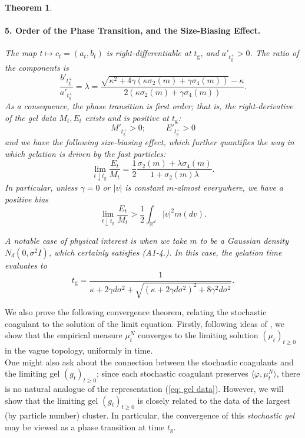 \documentclass[11pt, notitlepage]{article}
\newtheorem{thm}{Theorem}[section]
\begin{document}
\begin{thm}
\paragraph{\textbf{5. Order of the Phase Transition, and the Size-Biasing Effect.}} The map $t\mapsto c_t=(a_t,b_t)$ is right-differentiable at $t_\mathrm{g}$, and $a'_{t_\mathrm{g}^+}>0$. The ratio of the components is \begin{equation} \frac{b'_{t_\mathrm{g}^+}}{a'_{t_\mathrm{g}^+}}=\lambda =\frac{\sqrt{\kappa^2+4\gamma(\kappa\sigma_2(m)+\gamma \sigma_4(m))}-\kappa}{2(\kappa\sigma_2(m)+\gamma\sigma_4(m))}.\end{equation} As a consequence, the phase transition is first order; that is, the right-derivative of the gel data $M_t, E_t$ exists and is positive at $t_\mathrm{g}$: \begin{equation}M'_{t_\mathrm{g}^+}>0; \hspace{1cm} E'_{t_\mathrm{g}^+}>0 \end{equation} and we have the following \emph{size-biasing} effect, which further quantifies the way in which gelation is driven by the fast particles:  \begin{equation}
    \lim_{t\downarrow t_\mathrm{g}}\frac{E_t}{M_t}=\frac{1}{2}\frac{\sigma_2(m)+\lambda\sigma_4(m)}{1+\sigma_2(m)\lambda}.
\end{equation} In particular, unless $\gamma=0$ or $|v|$ is constant $m$-almost everywhere, we have a positive bias \begin{equation}
    \lim_{t\downarrow t_\mathrm{g}}\frac{E_t}{M_t}>\frac{1}{2}\int_{\mathbb{R}^d}|v|^2m(dv).
\end{equation}

A notable case of physical interest is when we take $m$ to be a Gaussian density $N_d(0, \sigma^2 I)$, which certainly satisfies (A1-4.). In this case, the gelation time evaluates to
\begin{equation}
    \label{eq: formula of tgel} t_\mathrm{g} = \frac{1}{\kappa+2\gamma d \sigma^2+
    \sqrt{(\kappa+2\gamma d \sigma^2)^2+8\gamma^2 d \sigma^2}}.
\end{equation} \end{thm}
We also prove the following convergence theorem, relating the stochastic coagulant to the solution of the limit equation. Firstly, following ideas of \cite{N00}, we show that the empirical measure $\mu^N_t$ converges to the limiting solution $(\mu_t)_{t\ge 0}$ in the vague topology, uniformly in time. \medskip \\ One might also ask about the connection between the stochastic coagulants and the limiting gel $(g_t)_{t\ge 0}$; since each stochastic coagulant preserves $\langle \varphi, \mu^N_t\rangle$, there is no natural analogue of the representation (\ref{eq: gel data}). However, we will show that the limiting gel $(g_t)_{t\ge 0}$ is closely related to the data of the largest (by particle number) cluster. In particular, the convergence of this \emph{stochastic gel} may be viewed as a phase transition at time $t_\mathrm{g}$.
\end{document}
